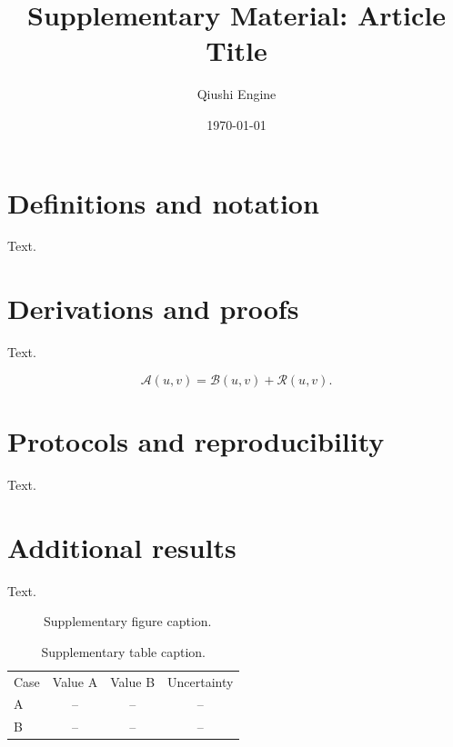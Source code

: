 \documentclass[aps,prl,onecolumn,10pt,superscriptaddress,nofootinbib,longbibliography]{revtex4-2}
\theoremstyle{definition}
\theoremstyle{remark}
\begin{document}
\title{Supplementary Material: Article Title}

\author{Qiushi Engine}
\noaffiliation

\date{\today}

\maketitle

\section{Definitions and notation}

Text.

\section{Derivations and proofs}

Text.

\begin{equation}
  \mathcal{A}(u,v)=\mathcal{B}(u,v)+\mathcal{R}(u,v).
  \label{eq:s-example}
\end{equation}

\section{Protocols and reproducibility}

Text.

\section{Additional results}

Text.

\begin{figure}[t]
  \centering
  \fbox{\rule{0pt}{1.7in}\rule{0.86\textwidth}{0pt}}
  \caption{Supplementary figure caption.\label{fig:s-example}}
\end{figure}

\begin{table}[t]
  \caption{Supplementary table caption.\label{tab:s-example}}
  \begin{ruledtabular}
  \begin{tabular}{lccc}
  Case & Value A & Value B & Uncertainty \\
  \colrule
  A & -- & -- & -- \\
  B & -- & -- & -- \\
  \end{tabular}
  \end{ruledtabular}
\end{table}

\end{document}
